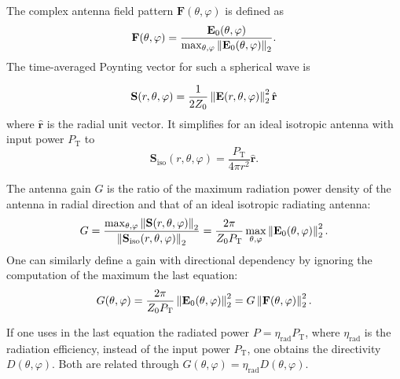 The complex antenna field pattern $\mathbf{F}(\theta, \varphi)$ is defined as
\begin{align}
        \label{eq:F}
    \mathbf{F}(\theta, \varphi) = \frac{ \mathbf{E}_0(\theta, \varphi)}{\max_{\theta,\varphi}\left\lVert\mathbf{E}_0(\theta, \varphi)\right\rVert_2}.
\end{align}
The time-averaged Poynting vector for such a spherical wave is

\begin{equation}
    \label{eq:S_spherical}
    \mathbf{S}(r, \theta, \varphi) = \frac{1}{2Z_0}\left\lVert\mathbf{E}(r, \theta, \varphi)\right\rVert_2^2 \hat{\mathbf{r}}
\end{equation}
where $\hat{\mathbf{r}}$ is the radial unit vector. It simplifies for an ideal isotropic antenna with input power $P_\text{T}$ to
\begin{equation}
    \mathbf{S}_\text{iso}(r, \theta, \varphi) = \frac{P_\text{T}}{4\pi r^2} \hat{\mathbf{r}}.
\end{equation}

The antenna gain $G$ is the ratio of the maximum radiation power density of the antenna in radial direction and that of an ideal isotropic radiating antenna:
\begin{equation}
    \label{eq:G}
    G = \frac{\max_{\theta,\varphi}\left\lVert\mathbf{S}(r, \theta, \varphi)\right\rVert_2}{ \left\lVert\mathbf{S}_\text{iso}(r, \theta, \varphi)\right\rVert_2}
          = \frac{2\pi}{Z_0 P_\text{T}} \max_{\theta,\varphi}\left\lVert\mathbf{E}_0(\theta, \varphi) \right\rVert_2^2.
\end{equation}
One can similarly define a gain with directional dependency by ignoring the computation of the maximum the last equation:
\begin{equation}
    \label{eq:Gdir}
    G(\theta, \varphi) = \frac{2\pi}{Z_0 P_\text{T}} \left\lVert\mathbf{E}_0(\theta, \varphi)\right\rVert_2^2 = G \left\lVert\mathbf{F}(\theta, \varphi)\right\rVert_2^2.
\end{equation}

If one uses in the last equation the radiated power $P=\eta_\text{rad} P_\text{T}$, where $\eta_\text{rad}$ is the radiation efficiency, instead of the input power $P_\text{T}$, one obtains the directivity $D(\theta,\varphi)$.
Both are related through $G(\theta, \varphi)=\eta_\text{rad} D(\theta, \varphi)$.

